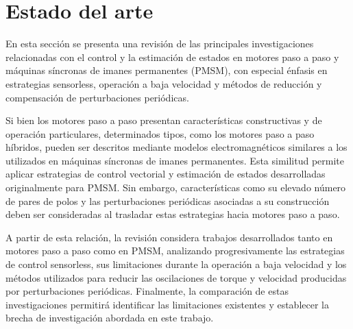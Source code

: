 \section{Estado del arte}
En esta sección se presenta una revisión de las principales investigaciones relacionadas con el control y la estimación de estados en motores paso a paso y máquinas síncronas de imanes permanentes (PMSM), con especial énfasis en estrategias sensorless, operación a baja velocidad y métodos de reducción y compensación de perturbaciones periódicas.

Si bien los motores paso a paso presentan características constructivas y de operación particulares, determinados tipos, como los motores paso a paso híbridos, pueden ser descritos mediante modelos electromagnéticos similares a los utilizados en máquinas síncronas de imanes permanentes. Esta similitud permite aplicar estrategias de control vectorial y estimación de estados desarrolladas originalmente para PMSM. Sin embargo, características como su elevado número de pares de polos y las perturbaciones periódicas asociadas a su construcción deben ser consideradas al trasladar estas estrategias hacia motores paso a paso.

A partir de esta relación, la revisión considera trabajos desarrollados tanto en motores paso a paso como en PMSM, analizando progresivamente las estrategias de control sensorless, sus limitaciones durante la operación a baja velocidad y los métodos utilizados para reducir las oscilaciones de torque y velocidad producidas por perturbaciones periódicas. Finalmente, la comparación de estas investigaciones permitirá identificar las limitaciones existentes y establecer la brecha de investigación abordada en este trabajo.
%
%
%
%
%
%


